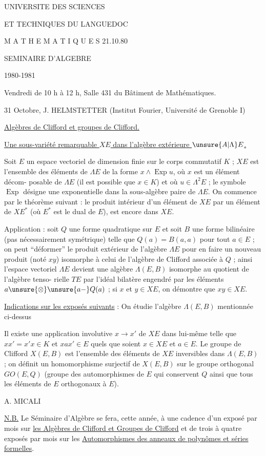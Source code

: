 
UNIVERSITE DES SCIENCES

ET TECHNIQUES DU LANGUEDOC

M A T H E M A T I Q U E S \hfill 21.10.80

\begin{center}
SEMINAIRE D'ALGEBRE

1980-1981
\end{center}

Vendredi de 10 h à 12 h, Salle 431 du Bâtiment de Mathématiques.

31 Octobre, J. HELMSTETTER (Institut Fourier, Université de Grenoble I)

\uline{Algèbres de Clifford et groupes de Clifford.}

\uline{Une sous-variété remarquable $XE$ dans l'algèbre extérieure $\unsure{A|\Lambda}E$.}

Soit $E$ un espace vectoriel de dimension finie sur le corps commutatif $K$ ; $XE$ est l'ensemble des éléments de $\Lambda E$ de la forme $x\wedge\operatorname{Exp}u$, où $x$ est un élément décom-\newline
posable de $\Lambda E$ (il est possible que $x\in K$) et où $u\in\Lambda^2E$ ; le symbole $\operatorname{Exp}$ désigne une exponentielle dans la sous-algèbre paire de $\Lambda E$. On commence par le théorème suivant : le produit intérieur d'un élément de $XE$ par un élément de $XE^*$ (où $E^*$ est le dual de $E$), est encore dans $XE$.

Application : soit $Q$ une forme quadratique sur $E$ et soit $B$ une forme bilinéaire (pas nécessairement symétrique) telle que $Q(a)=B(a,a)$ pour tout $a\in E$ ; on peut ``déformer'' le produit extérieur de l'algèbre $\Lambda E$ pour en faire un nouveau produit (noté $xy$) isomorphe à celui de l'algèbre de Clifford associée à $Q$ ; ainsi l'espace vectoriel $\Lambda E$ devient une algèbre $\Lambda(E,B)$ isomorphe au quotient de l'algèbre tenso-\newline
rielle $TE$ par l'idéal bilatère engendré par les éléments $a\unsure{\otimes}\unsure{a-}Q(a)$ ; si $x$ et $y\in XE$, on démontre que $xy\in XE$.

\uline{Indications sur les exposés suivants} : On étudie l'algèbre $\Lambda(E,B)$ mentionnée ci-dessus

Il existe une application involutive $x\to x'$ de $XE$ dans lui-même telle que $xx'=x'x\in K$ et $xax'\in E$ quels que soient $x\in XE$ et $a\in E$. Le groupe de Clifford $X(E,B)$ est l'ensemble des éléments de $XE$ inversibles dans $\Lambda(E,B)$ ; on définit un homomorphisme surjectif de $X(E,B)$ sur le groupe orthogonal $GO(E,Q)$ (groupe des automorphismes de $E$ qui conservent $Q$ ainsi que tous les éléments de $E$ orthogonaux à $E$).

\hfill A. MICALI

\uline{N.B.} Le Séminaire d'Algèbre se fera, cette année, à une cadence d'un exposé par mois sur \uline{les Algèbres de Clifford et Groupes de Clifford} et de trois à quatre exposés par mois sur les \uline{Automorphismes des anneaux de polynômes et séries formelles}.

